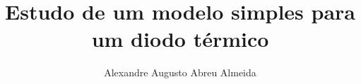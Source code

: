 \documentclass[master,american]{ThesisPUC}
\author{Alexandre Augusto Abreu Almeida}
\title{Estudo de um modelo simples para um diodo térmico}
\begin{document}
  
  
  
  
  
  
  
  \arial
  \nocite{*}
  
  \normalfont
%  
\end{document}
